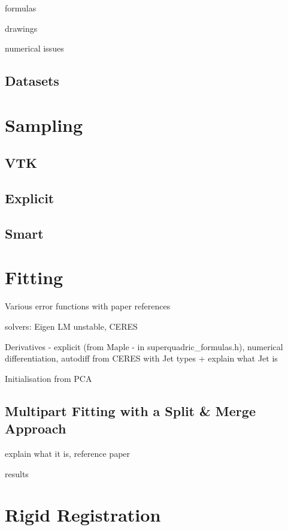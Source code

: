 \documentclass{article}
\begin{document}
formulas

drawings

numerical issues

\subsection {Datasets}


\section {Sampling}

\subsection {VTK}

\subsection {Explicit}

\subsection {Smart}


\section {Fitting}

Various error functions with paper references

solvers: Eigen LM unstable, CERES

Derivatives - explicit (from Maple - in superquadric\_formulas.h), numerical differentiation, autodiff from CERES with Jet types + explain what Jet is

Initialisation from PCA

\subsection {Multipart Fitting with a Split \& Merge Approach}

explain what it is, reference paper

results


\section {Rigid Registration}
\end{document}
